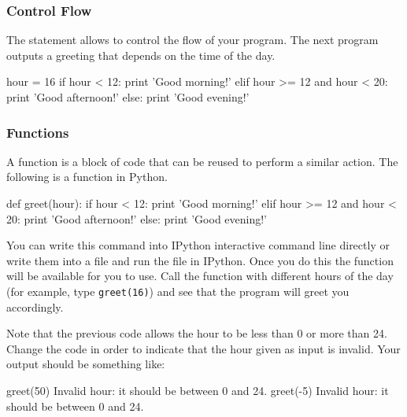 
\subsubsection{Control Flow}

The  statement allows to control the flow of your program. The next program outputs a greeting that depends on the time of the day.

\begin{python}
hour = 16
if hour < 12:
    print 'Good morning!'
elif hour >= 12 and hour < 20:
    print 'Good afternoon!'
else:
    print 'Good evening!'
\end{python}

 
\subsubsection{Functions}

A function is a block of code that can be reused to perform a similar action. The following is a function in Python. 

\begin{python}
def greet(hour):
    if hour < 12:
        print 'Good morning!'
    elif hour >= 12 and hour < 20:
        print 'Good afternoon!'
    else:
        print 'Good evening!'
\end{python}

You can write this command into IPython interactive command line directly or write them into a file and run the file in IPython. Once you do this the function will be available for you to use. Call the function  with different hours of the day (for example, type \texttt{greet(16)}) and see that the program will greet you accordingly.

\begin{exercise}
Note that the previous code allows the hour to be less than 0 or more than 24. Change the code in order to indicate that the hour given as input is invalid. Your output should be something like:

\begin{python}
greet(50)
Invalid hour: it should be between 0 and 24.
greet(-5)
Invalid hour: it should be between 0 and 24.
\end{python}

\end{exercise}

